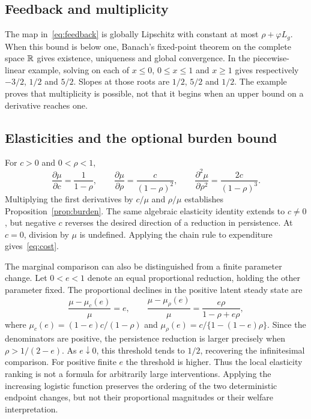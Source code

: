 \subsection{Feedback and multiplicity}
The map in~\eqref{eq:feedback} is globally Lipschitz with constant at most
$\rho+\varphi L_g$. When this bound is below one, Banach's fixed-point
theorem on the complete space $\mathbb{R}$ gives existence, uniqueness and global
convergence. In the piecewise-linear example, solving on each of
$x\le0$, $0\le x\le1$ and $x\ge1$ gives respectively $-3/2$, $1/2$ and
$5/2$. Slopes at those roots are $1/2$, $5/2$ and $1/2$.
The example proves that multiplicity is possible, not that it begins when
an upper bound on a derivative reaches one.

\subsection{Elasticities and the optional burden bound}
For $c>0$ and $0<\rho<1$,
\[
 \frac{\partial\mu}{\partial c}=\frac1{1-\rho},\qquad
 \frac{\partial\mu}{\partial\rho}=\frac{c}{(1-\rho)^2},\qquad
 \frac{\partial^2\mu}{\partial\rho^2}=\frac{2c}{(1-\rho)^3}.
\]
Multiplying the first derivatives by $c/\mu$ and $\rho/\mu$ establishes
Proposition~\ref{prop:burden}. The same algebraic elasticity identity extends
to $c\ne0$, but negative $c$ reverses the desired direction of a reduction
in persistence. At $c=0$, division by $\mu$ is undefined. Applying the chain
rule to expenditure gives~\eqref{eq:cost}.

The marginal comparison can also be distinguished from a finite parameter
change. Let $0<e<1$ denote an equal proportional reduction, holding the other
parameter fixed. The proportional declines in the positive latent steady
state are
\begin{equation}\label{eq:finite-reduction}
 \frac{\mu-\mu_c(e)}{\mu}=e,\qquad
 \frac{\mu-\mu_\rho(e)}{\mu}
 =\frac{e\rho}{1-\rho+e\rho},
\end{equation}
where $\mu_c(e)=(1-e)c/(1-\rho)$ and
$\mu_\rho(e)=c/\{1-(1-e)\rho\}$. Since the denominators are positive,
the persistence reduction is larger precisely when $\rho>1/(2-e)$.
As $e\downarrow0$, this threshold tends to $1/2$, recovering the
infinitesimal comparison. For positive finite $e$ the threshold is higher.
Thus the local elasticity ranking is not a formula for arbitrarily large
interventions. Applying the increasing logistic function preserves the
ordering of the two deterministic endpoint changes, but not their
proportional magnitudes or their welfare interpretation.

